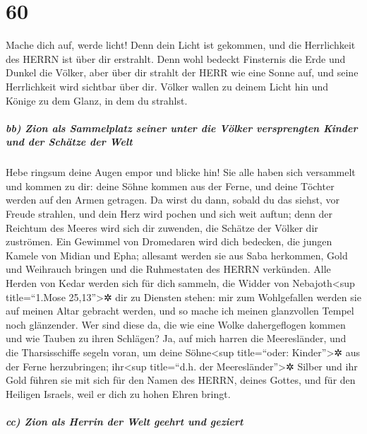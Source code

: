 \hypertarget{section-59}{%
\section{60}\label{section-59}}

Mache dich auf, werde licht! Denn dein Licht ist gekommen,
und die Herrlichkeit des HERRN ist über dir erstrahlt.
Denn wohl bedeckt Finsternis die Erde und Dunkel die
Völker, aber über dir strahlt der HERR wie eine Sonne auf, und seine
Herrlichkeit wird sichtbar über dir. Völker wallen zu
deinem Licht hin und Könige zu dem Glanz, in dem du strahlst.

\hypertarget{bb-zion-als-sammelplatz-seiner-unter-die-vuxf6lker-versprengten-kinder-und-der-schuxe4tze-der-welt}{%
\subparagraph{bb) Zion als Sammelplatz seiner unter die Völker
versprengten Kinder und der Schätze der
Welt}\label{bb-zion-als-sammelplatz-seiner-unter-die-vuxf6lker-versprengten-kinder-und-der-schuxe4tze-der-welt}}

Hebe ringsum deine Augen empor und blicke hin! Sie alle
haben sich versammelt und kommen zu dir: deine Söhne kommen aus der
Ferne, und deine Töchter werden auf den Armen getragen. Da
wirst du dann, sobald du das siehst, vor Freude strahlen, und dein Herz
wird pochen und sich weit auftun; denn der Reichtum des Meeres wird sich
dir zuwenden, die Schätze der Völker dir zuströmen. Ein
Gewimmel von Dromedaren wird dich bedecken, die jungen Kamele von Midian
und Epha; allesamt werden sie aus Saba herkommen, Gold und Weihrauch
bringen und die Ruhmestaten des HERRN verkünden. Alle
Herden von Kedar werden sich für dich sammeln, die Widder von
Nebajoth\textless sup title=``1.Mose 25,13''\textgreater✲ dir zu
Diensten stehen: mir zum Wohlgefallen werden sie auf meinen Altar
gebracht werden, und so mache ich meinen glanzvollen Tempel noch
glänzender. Wer sind diese da, die wie eine Wolke
dahergeflogen kommen und wie Tauben zu ihren Schlägen? Ja,
auf mich harren die Meeresländer, und die Tharsisschiffe segeln voran,
um deine Söhne\textless sup title=``oder: Kinder''\textgreater✲ aus der
Ferne herzubringen; ihr\textless sup title=``d.h. der
Meeresländer''\textgreater✲ Silber und ihr Gold führen sie mit sich für
den Namen des HERRN, deines Gottes, und für den Heiligen Israels, weil
er dich zu hohen Ehren bringt.

\hypertarget{cc-zion-als-herrin-der-welt-geehrt-und-geziert}{%
\subparagraph{cc) Zion als Herrin der Welt geehrt und
geziert}\label{cc-zion-als-herrin-der-welt-geehrt-und-geziert}}

